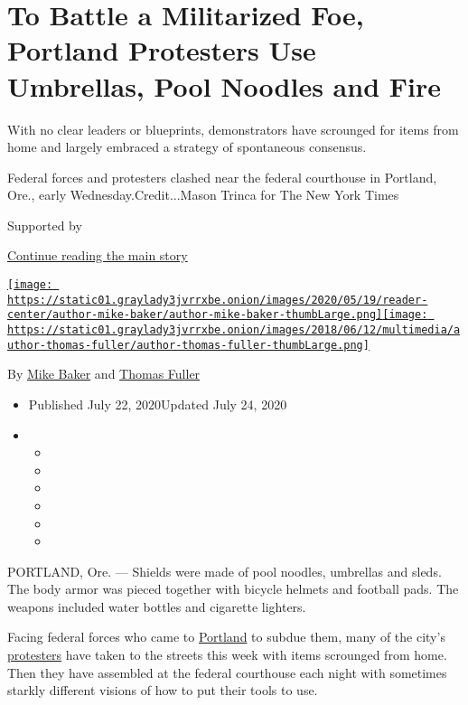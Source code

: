 \hypertarget{to-battle-a-militarized-foe-portland-protesters-use-umbrellas-pool-noodles-and-fire}{%
\section{To Battle a Militarized Foe, Portland Protesters Use Umbrellas,
Pool Noodles and
Fire}\label{to-battle-a-militarized-foe-portland-protesters-use-umbrellas-pool-noodles-and-fire}}

With no clear leaders or blueprints, demonstrators have scrounged for
items from home and largely embraced a strategy of spontaneous
consensus.

Federal forces and protesters clashed near the federal courthouse in
Portland, Ore., early Wednesday.Credit...Mason Trinca for The New York
Times

Supported by

\protect\hyperlink{after-sponsor}{Continue reading the main story}

\href{https://www.nytimes3xbfgragh.onion/by/mike-baker}{\texttt{[image: https://static01.graylady3jvrrxbe.onion/images/2020/05/19/reader-center/author-mike-baker/author-mike-baker-thumbLarge.png]}}\href{https://www.nytimes3xbfgragh.onion/by/thomas-fuller}{\texttt{[image: https://static01.graylady3jvrrxbe.onion/images/2018/06/12/multimedia/author-thomas-fuller/author-thomas-fuller-thumbLarge.png]}}

By \href{https://www.nytimes3xbfgragh.onion/by/mike-baker}{Mike Baker}
and \href{https://www.nytimes3xbfgragh.onion/by/thomas-fuller}{Thomas
Fuller}

\begin{itemize}
\item
  Published July 22, 2020Updated July 24, 2020
\item
  \begin{itemize}
  \item
  \item
  \item
  \item
  \item
  \item
  \end{itemize}
\end{itemize}

PORTLAND, Ore. --- Shields were made of pool noodles, umbrellas and
sleds. The body armor was pieced together with bicycle helmets and
football pads. The weapons included water bottles and cigarette
lighters.

Facing federal forces who came to
\href{https://www.nytimes3xbfgragh.onion/article/portland-protests-explained-protesters.html}{Portland}
to subdue them, many of the city's
\href{https://www.nytimes3xbfgragh.onion/interactive/2020/07/22/us/portland-protests.html}{protesters}
have taken to the streets this week with items scrounged from home. Then
they have assembled at the federal courthouse each night with sometimes
starkly different visions of how to put their tools to use.


